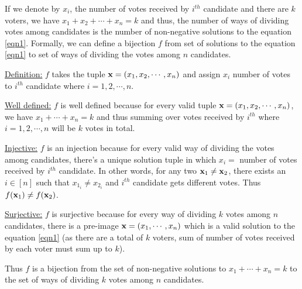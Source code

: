 If we denote by $x_i$, the number of votes received by $i^{th}$ candidate and there are $k$ voters, we have $x_1+x_2+\cdots+x_n=k$ and thus, the number of ways of dividing votes among candidates is the number of non-negative solutions to the equation \ref{eqn1}. Formally, we can define a bijection $f$ from set of solutions to the equation \ref{eqn1} to set of ways of dividing the votes among $n$ candidates. 
\begin{description}
\item\underline{Definition:}  $f$ takes the tuple $\mathbf{x}=(x_1,x_2,\cdots,x_n)$ and assign $x_i$ number of votes to $i^{th}$ candidate where $i=1,2,\cdots,n$.
\item\underline{Well defined:} $f$ is well defined because for every valid tuple $\mathbf{x}=(x_1,x_2,\cdots,x_n)$, we have $x_1+\cdots+x_n=k$ and thus summing over votes received by $i^{th}$ where $i=1,2,\cdots,n$ will be $k$ votes in total. 
\item\underline{Injective:} $f$ is an injection because for every valid way of dividing the votes among candidates, there's a unique solution tuple in which $x_i = $ number of votes received by $i^{th}$ candidate. In other words, for any two $\mathbf{x}_1\neq\mathbf{x}_2$, there exists an $i\in[n]$ such that $x_{1_i}\neq x_{2_i}$ and $i^{th}$ candidate gets different votes. Thus $f(\mathbf{x}_1)\neq f(\mathbf{x}_2)$.
\item\underline{Surjective:} $f$ is surjective because for every way of dividing $k$ votes among $n$ candidates, there is a pre-image $\mathbf{x}=(x_1,\cdots,x_n)$ which is a valid solution to the equation \ref{eqn1} (as there are a total of $k$ voters, sum of number of votes received by each voter must sum up to $k$). 
\end{description}
Thus $f$ is a bijection from the set of non-negative solutions to $x_1+\cdots+x_n=k$ to the set of ways of dividing $k$ votes among $n$ candidates.
